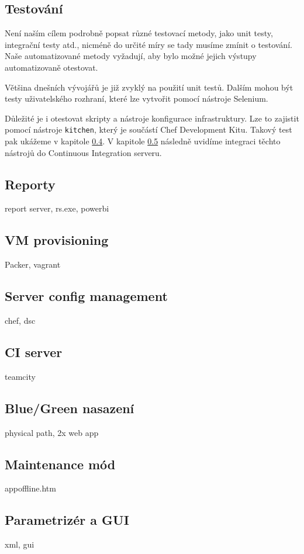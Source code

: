\subsection{Testování}
Není naším cílem podrobně popsat různé testovací metody, jako unit testy, integrační testy atd., nicméně do určité míry se tady musíme zmínit o testování. Naše automatizované metody vyžadují, aby bylo možné jejich výstupy automatizovaně otestovat. 

Většina dnešních vývojářů je již zvyklý na použití unit testů. Dalším mohou být testy uživatelského rozhraní, které lze vytvořit pomocí nástroje Selenium.

Důležité je i otestovat skripty a nástroje konfigurace infrastruktury. Lze to zajistit pomocí nástroje \texttt{kitchen}, který je součástí Chef Development Kitu. Takový test pak ukážeme v kapitole \ref{ch:serverconfig}. V kapitole \ref{ch:ciserver} následně uvidíme integraci těchto nástrojů do Continuous Integration serveru. 

\subsection{Reporty}
report server, rs.exe, powerbi

\subsection{VM provisioning}
Packer, vagrant

\subsection{Server config management}
\label{ch:serverconfig}
chef, dsc

\subsection{CI server}
\label{ch:ciserver}
teamcity

\subsection{Blue/Green nasazení}
physical path, 2x web app

\subsection{Maintenance mód}
appoffline.htm

\subsection{Parametrizér a GUI}
xml, gui

